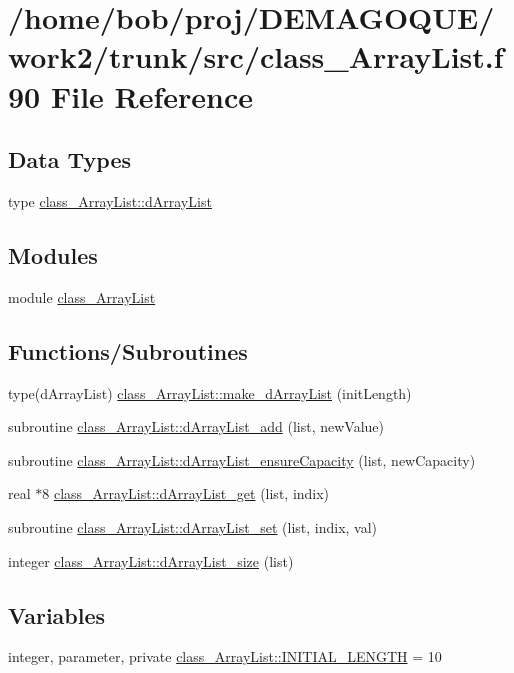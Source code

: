 \hypertarget{class__ArrayList_8f90}{
\section{/home/bob/proj/DEMAGOQUE/work2/trunk/src/class\_\-ArrayList.f90 File Reference}
\label{class__ArrayList_8f90}
}
\subsection*{Data Types}
\begin{DoxyCompactItemize}
\item 
type \hyperlink{typeclass__ArrayList_1_1dArrayList}{class\_\-ArrayList::dArrayList}
\end{DoxyCompactItemize}
\subsection*{Modules}
\begin{DoxyCompactItemize}
\item 
module \hyperlink{namespaceclass__ArrayList}{class\_\-ArrayList}
\end{DoxyCompactItemize}
\subsection*{Functions/Subroutines}
\begin{DoxyCompactItemize}
\item 
type(dArrayList) \hyperlink{namespaceclass__ArrayList_a5363f41df7698922433c25c73d02173d}{class\_\-ArrayList::make\_\-dArrayList} (initLength)
\item 
subroutine \hyperlink{namespaceclass__ArrayList_a87eba505c7caff1cf303b9f92182aab2}{class\_\-ArrayList::dArrayList\_\-add} (list, newValue)
\item 
subroutine \hyperlink{namespaceclass__ArrayList_a772b1369610a1b6481ef81093a7ecadf}{class\_\-ArrayList::dArrayList\_\-ensureCapacity} (list, newCapacity)
\item 
real $\ast$8 \hyperlink{namespaceclass__ArrayList_a956a11e0e4778170667c2e90c9097766}{class\_\-ArrayList::dArrayList\_\-get} (list, indix)
\item 
subroutine \hyperlink{namespaceclass__ArrayList_ad92f2ac90292027093572f20b4be9dc6}{class\_\-ArrayList::dArrayList\_\-set} (list, indix, val)
\item 
integer \hyperlink{namespaceclass__ArrayList_a723eb1c041604ffeb1a0434c521de640}{class\_\-ArrayList::dArrayList\_\-size} (list)
\end{DoxyCompactItemize}
\subsection*{Variables}
\begin{DoxyCompactItemize}
\item 
integer, parameter, private \hyperlink{namespaceclass__ArrayList_a710a353a125e9fcbc6bbb0fc3a468afb}{class\_\-ArrayList::INITIAL\_\-LENGTH} = 10
\end{DoxyCompactItemize}
